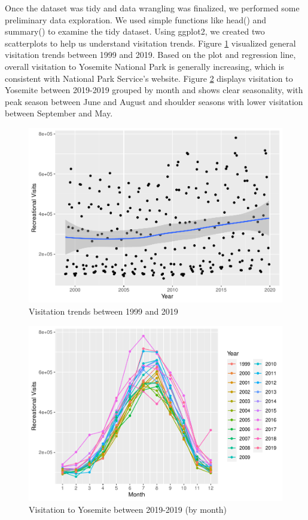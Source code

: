 \documentclass[
  12pt,
]{article}
\begin{document}
Once the dataset was tidy and data wrangling was finalized, we performed some preliminary data exploration. We used simple functions like head() and summary() to examine the tidy dataset. Using ggplot2, we created two scatterplots to help us understand visitation trends. Figure \ref{fig:VisitDataExp1} visualized general visitation trends between 1999 and 2019. Based on the plot and regression line, overall visitation to Yosemite National Park is generally increasing, which is consistent with National Park Service's website. Figure \ref{fig:VisitDataExp2} displays visitation to Yosemite between 2019-2019 grouped by month and shows clear seasonality, with peak season between June and August and shoulder seasons with lower visitation between September and May.

\begin{figure}
\centering
\includegraphics{CodeFinal_files/figure-latex/VisitDataExp1-1.pdf}
\caption{\label{fig:VisitDataExp1}Visitation trends between 1999 and 2019}
\end{figure}

\begin{figure}
\centering
\includegraphics{CodeFinal_files/figure-latex/VisitDataExp2-1.pdf}
\caption{\label{fig:VisitDataExp2}Visitation to Yosemite between 2019-2019 (by month)}
\end{figure}
\end{document}
